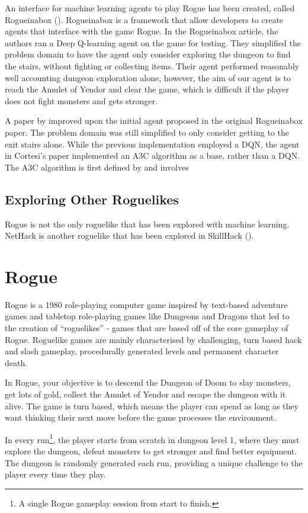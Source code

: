 \documentclass[11pt,a4paper]{article}
\begin{document}
An interface for machine learning agents to play Rogue has been created, called Rogueinabox (\cite{asperti17}). Rogueinabox is a framework that allow developers to create agents that interface with the game Rogue. In the Rogueinabox article, the authors ran a Deep Q-learning agent on the game for testing. They simplified the problem domain to have the agent only consider exploring the dungeon to find the stairs, without fighting or collecting items. Their agent performed reasonably well accounting dungeon exploration alone, however, the aim of our agent is to reach the Amulet of Yendor and clear the game, which is difficult if the player does not fight monsters and gets stronger.

A paper by \cite{cortesi18} improved upon the initial agent proposed in the original Rogueinabox paper. The problem domain was still simplified to only consider getting to the exit stairs alone. While the previous implementation employed a DQN, the agent in Cortesi's paper implemented an A3C algorithm as a base, rather than a DQN. The A3C algorithm is first defined by \cite{mnih15} and involves 

\subsection{Exploring Other Roguelikes}
Rogue is not the only roguelike that has been explored with machine learning. NetHack is another roguelike that has been explored in SkillHack (\cite{matthews22}).

\section{Rogue}
Rogue is a 1980 role-playing computer game inspired by text-based adventure games and tabletop role-playing games like Dungeons and Dragons that led to the creation of ``roguelikes'' - games that are based off of the core gameplay of Rogue. Roguelike games are mainly characterised by challenging, turn based hack and slash gameplay, procedurally generated levels and permanent character death.

In Rogue, your objective is to descend the Dungeon of Doom to slay monsters, get lots of gold, collect the Amulet of Yendor and escape the dungeon with it alive. The game is turn based, which means the player can spend as long as they want thinking their next move before the game processes the environment.

In every run\footnote{A single Rogue gameplay session from start to finish.}, the player starts from scratch in dungeon level 1, where they must explore the dungeon, defeat monsters to get stronger and find better equipment. The dungeon is randomly generated each run, providing a unique challenge to the player every time they play.
\end{document}
